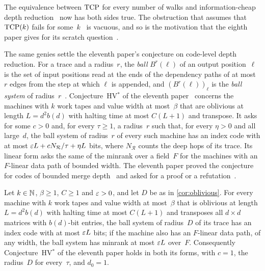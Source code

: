 The equivalence between $\mathrm{TCP}$ for every number of walks and information-cheap depth reduction~\cite[Theorem~I]{InfoDepthMemo2026}
now has both sides true. The obstruction that assumes that $\mathrm{TCP}(k)$ fails for some~$k$~\cite[Theorem~H]{InfoDepthMemo2026} is
vacuous, and so is the motivation that the eighth paper gives for its scratch question~\cite[Problem~10.5]{EighthPaper2026}.

The same genies settle the eleventh paper's conjecture on code-level depth reduction. For a trace and a radius~$r$, the
\emph{ball} $B^r(\ell)$ of an output position~$\ell$ is the set of input positions read at the ends of the dependency paths of
at most $r$ edges from the step at which $\ell$ is appended, and $(B^r(\ell))_\ell$ is the \emph{ball system} of
radius~$r$~\cite[Definitions~7.2 and~7.4]{EighthPaper2026}. Conjecture~HV$^*$ of the eleventh paper~\cite[Conjecture~3.22]{MergeDepth2026}
concerns the machines with $k$ work tapes and value width at most~$\beta$ that are oblivious at length $L=d^2b(d)$ with halting
time at most $C(L+1)$ and transpose. It asks for some $c>0$ and, for every $\tau\ge1$, a radius~$r$ such that, for every $\eta>0$
and all large~$d$, the ball system of radius~$r$ of every such machine has an index code with at most
$\varepsilon L+cN_{\mathcal R}/\tau+\eta L$ bits, where $N_{\mathcal R}$ counts the deep hops of its trace. Its linear form asks the
same of the minrank over a field~$F$ for the machines with an $F$-linear data path of bounded width. The eleventh paper proved
the conjecture for codes of bounded merge depth~\cite[Remark~3.23(a)]{MergeDepth2026} and asked for a proof or a
refutation~\cite[Problem~9.1]{MergeDepth2026}.

\begin{corollary}\label{cor:HV}
Let $k\in\mathbb{N}$, $\beta\ge1$, $C\ge1$ and $\varepsilon>0$, and let $D$ be as in \cref{cor:oblivious}. For every machine with $k$ work
tapes and value width at most~$\beta$ that is oblivious at length $L=d^2b(d)$ with halting time at most $C(L+1)$ and transposes
all $d\times d$ matrices with $b(d)$-bit entries, the ball system of radius~$D$ of its trace has an index code with at most
$\varepsilon L$ bits; if the machine also has an $F$-linear data path, of any width, the ball system has minrank at most $\varepsilon L$
over~$F$. Consequently Conjecture~HV$^*$ of the eleventh paper holds in both its forms, with $c=1$, the radius~$D$ for
every~$\tau$, and $d_0=1$.
\end{corollary}

